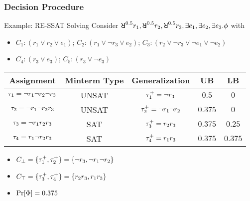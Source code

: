 \begin{frame}
    \frametitle{Decision Procedure}
    \begin{block}{Example: RE-SSAT Solving}
        Consider $\random{0.5}r_1,\random{0.5}r_2,\random{0.5}r_3,\exists e_1,\exists e_2,\exists e_3.\pf$ with
        \begin{itemize}
            \item[] $C_1: (r_1 \lor r_2 \lor e_1)$; $C_2: (r_1 \lor \lnot r_3 \lor e_2)$; $C_3: (r_2 \lor \lnot r_3 \lor \lnot e_1 \lor \lnot e_2)$
            \item[] $C_4: (r_3 \lor e_3)$; $C_5: (r_3 \lor \lnot e_3)$
        \end{itemize}
        \pause
        \begin{table}[t]
            \centering
            \small
            \begin{tabular}{c|c|c|c|c}
                Assignment                            & Minterm Type & Generalization                & UB      & LB      \\
                \hline
                $\tau_1=\lnot r_1 \lnot r_2 \lnot r_3$ & UNSAT        & $\tau_1^+=\lnot r_3$           & $0.5$   & $0$     \\
                \pause
                $\tau_2=\lnot r_1 \lnot r_2 r_3$       & UNSAT        & $\tau_2^+=\lnot r_1 \lnot r_2$ & $0.375$ & $0$     \\
                \pause
                $\tau_3=\lnot r_1 r_2 r_3$             & SAT          & $\tau_3^+=r_2r_3$              & $0.375$ & $0.25$  \\
                \pause
                $\tau_4=r_1 \lnot r_2 r_3$             & SAT          & $\tau_4^+=r_1r_3$              & $0.375$ & $0.375$
            \end{tabular}
        \end{table}
        \pause
        \begin{itemize}
            \item $C_\bot=\{\tau_1^+,\tau_2^+\}=\{\lnot r_3,\lnot r_1 \lnot r_2\}$
            \item $C_\top=\{\tau_3^+,\tau_4^+\}=\{r_2r_3,r_1r_3\}$
            \item $\Pr[\Phi]=0.375$
        \end{itemize}
    \end{block}
\end{frame}